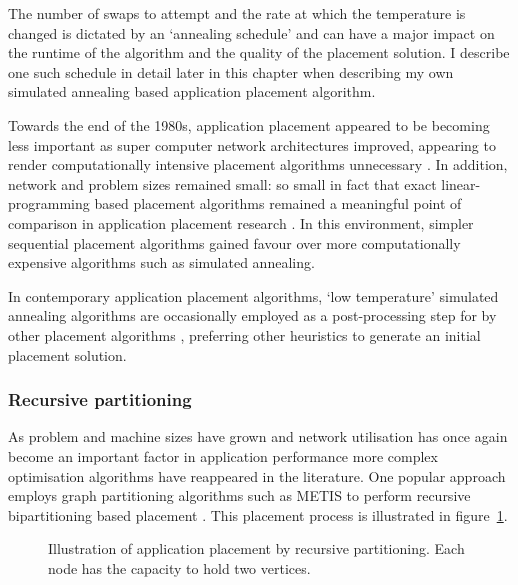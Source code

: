 				The number of swaps to attempt and the rate at which the temperature is
				changed is dictated by an `annealing schedule' and can have a major
				impact on the runtime of the algorithm and the quality of the placement
				solution. I describe one such schedule in detail later in this chapter
				when describing my own simulated annealing based application placement
				algorithm.
				
				Towards the end of the 1980s, application placement appeared to be
				becoming less important as super computer network architectures
				improved, appearing to render computationally intensive placement
				algorithms unnecessary \cite{dally87}.  In addition, network and
				problem sizes remained small: so small in fact that exact
				linear-programming based placement algorithms remained a meaningful
				point of comparison in application placement research \cite{xu91}. In
				this environment, simpler sequential placement algorithms gained favour
				over more computationally expensive algorithms such as simulated
				annealing.
				
				In contemporary application placement algorithms, `low temperature'
				simulated annealing algorithms are occasionally employed as a
				post-processing step for by other placement algorithms
				\cite{hoefler11}, preferring other heuristics to generate an initial
				placement solution.
				
			
			\subsubsection{Recursive partitioning}
				
				As problem and machine sizes have grown and network utilisation has
				once again become an important factor in application performance
				\cite{navaridas09b} more complex optimisation algorithms have
				reappeared in the literature. One popular approach employs graph
				partitioning algorithms such as METIS \cite{karypis98} to perform
				recursive bipartitioning based placement
				\cite{phillips14,hoefler11,pellegrini96}.  This placement process is
				illustrated in figure~\ref{fig:partitioning}.
				
				\begin{figure}
					\center
					
					\caption[Application placement by recursive partitioning.]%
					{Illustration of application placement by recursive
					partitioning. Each node has the capacity to hold two vertices.}
					\label{fig:partitioning}
				\end{figure}
				
